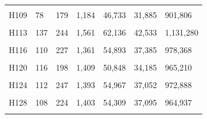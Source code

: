 \documentclass[
  a4paper,
  titlepage]{article}
\begin{document}
\begin{longtable}[t]{lllllll}
\cellcolor{gray!6}{H108} & \cellcolor{gray!6}{103} & \cellcolor{gray!6}{173} & \cellcolor{gray!6}{1,203} & \cellcolor{gray!6}{46,738} & \cellcolor{gray!6}{31,715} & \cellcolor{gray!6}{850,738}\\
 
H109 & 78 & 179 & 1,184 & 46,733 & 31,885 & 901,806\\
 
\cellcolor{gray!6}{H112} & \cellcolor{gray!6}{124} & \cellcolor{gray!6}{244} & \cellcolor{gray!6}{1,618} & \cellcolor{gray!6}{63,614} & \cellcolor{gray!6}{43,197} & \cellcolor{gray!6}{1,138,986}\\
 
H113 & 137 & 244 & 1,561 & 62,136 & 42,533 & 1,131,280\\
 
\cellcolor{gray!6}{H115} & \cellcolor{gray!6}{169} & \cellcolor{gray!6}{301} & \cellcolor{gray!6}{2,002} & \cellcolor{gray!6}{74,325} & \cellcolor{gray!6}{49,615} & \cellcolor{gray!6}{1,350,179}\\
 
H116 & 110 & 227 & 1,361 & 54,893 & 37,385 & 978,368\\
 
\cellcolor{gray!6}{H117} & \cellcolor{gray!6}{139} & \cellcolor{gray!6}{269} & \cellcolor{gray!6}{1,746} & \cellcolor{gray!6}{65,468} & \cellcolor{gray!6}{43,842} & \cellcolor{gray!6}{1,114,158}\\
 
H120 & 116 & 198 & 1,409 & 50,848 & 34,185 & 965,210\\
 
\cellcolor{gray!6}{H121} & \cellcolor{gray!6}{96} & \cellcolor{gray!6}{194} & \cellcolor{gray!6}{1,213} & \cellcolor{gray!6}{48,521} & \cellcolor{gray!6}{33,661} & \cellcolor{gray!6}{955,552}\\
 
H124 & 112 & 247 & 1,393 & 54,967 & 37,052 & 972,888\\
 
\cellcolor{gray!6}{H127} & \cellcolor{gray!6}{101} & \cellcolor{gray!6}{213} & \cellcolor{gray!6}{1,460} & \cellcolor{gray!6}{54,276} & \cellcolor{gray!6}{36,929} & \cellcolor{gray!6}{915,256}\\
 
H128 & 108 & 224 & 1,403 & 54,309 & 37,095 & 964,937\\
 
\cellcolor{gray!6}{H129} & \cellcolor{gray!6}{98} & \cellcolor{gray!6}{155} & \cellcolor{gray!6}{1,063} & \cellcolor{gray!6}{41,357} & \cellcolor{gray!6}{27,873} & \cellcolor{gray!6}{748,967}\\
 

\end{longtable}
\end{document}
